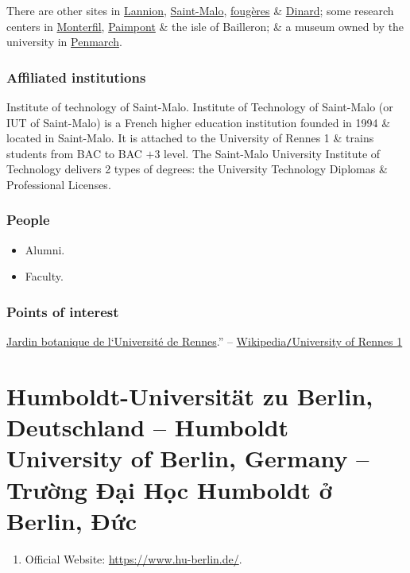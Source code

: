 \documentclass{article}
\begin{document}
There are other sites in \href{https://en.wikipedia.org/wiki/Lannion}{Lannion}, \href{https://en.wikipedia.org/wiki/Saint-Brieuc}{Saint-Malo}, \href{https://en.wikipedia.org/wiki/Foug%C3%A8res}{foug\`eres} \& \href{https://en.wikipedia.org/wiki/Dinard}{Dinard}; some research centers in \href{https://en.wikipedia.org/wiki/Monterfil}{Monterfil}, \href{https://en.wikipedia.org/wiki/Paimpont}{Paimpont} \& the isle of Bailleron; \& a museum owned by the university in \href{https://en.wikipedia.org/wiki/Penmarch}{Penmarch}.

\subsubsection{Affiliated institutions}

{\sf Institute of technology of Saint-Malo.} Institute of Technology of Saint-Malo (or IUT of Saint-Malo) is a French higher education institution founded in 1994 \& located in Saint-Malo. It is attached to the University of Rennes 1 \& trains students from BAC to BAC $+3$ level. The Saint-Malo University Institute of Technology delivers 2 types of degrees: the University Technology Diplomas \& Professional Licenses.

\subsubsection{People}

\begin{itemize}
	\item {\sf Alumni.}
	\item {\sf Faculty.}
\end{itemize}

\subsubsection{Points of interest}
\href{https://en.wikipedia.org/wiki/Jardin_botanique_de_l%27Universit%C3%A9_de_Rennes}{Jardin botanique de l`Universit\'e de Rennes}.'' -- \href{https://en.wikipedia.org/wiki/University_of_Rennes_1}{Wikipedia{\tt/}University of Rennes 1}


\section{Humboldt-Universität zu Berlin, Deutschland -- Humboldt University of Berlin, Germany -- Trường Đại Học Humboldt ở Berlin, Đức}
\begin{enumerate}
	\item Official Website: \url{https://www.hu-berlin.de/}.
\end{enumerate}
\end{document}
